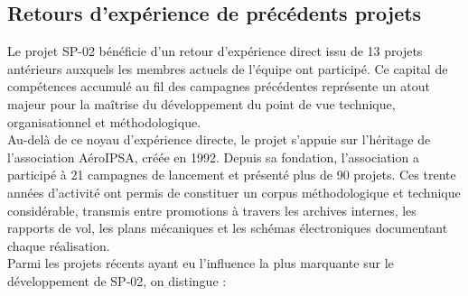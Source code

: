 \subsection{Retours d'expérience de précédents projets}
\label{subsec:retour_exp}

Le projet SP-02 bénéficie d’un retour d’expérience direct issu de 13 projets antérieurs auxquels les membres actuels de l’équipe
ont participé. Ce capital de compétences accumulé au fil des campagnes précédentes représente un atout majeur pour la maîtrise
du développement du point de vue technique, organisationnel et méthodologique.\\

Au-delà de ce noyau d’expérience directe, le projet s’appuie sur l’héritage de l’association AéroIPSA, créée en 1992. Depuis sa
fondation, l’association a participé à 21 campagnes de lancement et présenté plus de 90 projets. Ces trente années d’activité ont
permis de constituer un corpus méthodologique et technique considérable, transmis entre promotions à travers les archives
internes, les rapports de vol, les plans mécaniques et les schémas électroniques documentant chaque réalisation. \cite{AeroIPSA}\\

Parmi les projets récents ayant eu l’influence la plus marquante sur le développement de SP-02, on distingue :\\

